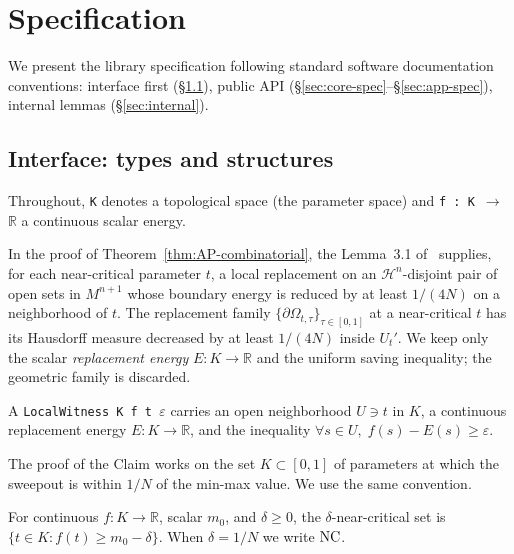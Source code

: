 \section{Specification}
\label{sec:spec}

We present the library specification following standard software
documentation conventions: interface first
(\S\ref{sec:interface}), public API
(\S\ref{sec:core-spec}--\S\ref{sec:app-spec}), internal lemmas
(\S\ref{sec:internal}).

\subsection{Interface: types and structures}
\label{sec:interface}

Throughout, \texttt{K} denotes a topological space (the parameter
space) and \texttt{f : K $\to$ $\mathbb{R}$} a continuous scalar
energy.

In the proof of Theorem~\ref{thm:AP-combinatorial}, the
Lemma~3.1 of~\cite{DLT13} supplies, for each near-critical
parameter $t$, a local replacement on an
$\mathcal{H}^n$-disjoint pair of open sets in $M^{n+1}$ whose
boundary energy is reduced by at least $1/(4N)$ on a
neighborhood of $t$. The replacement family
$\{\partial \Omega_{t,\tau}\}_{\tau \in [0,1]}$ at a
near-critical $t$ has its Hausdorff measure decreased by at
least $1/(4N)$ inside $U_t'$. We keep only the scalar
\emph{replacement energy} $E : K \to \mathbb{R}$ and the
uniform saving inequality; the geometric family is discarded.

\begin{definition}
\label{def:witness}
A \texttt{LocalWitness K f t $\varepsilon$} carries an open
neighborhood $U \ni t$ in $K$, a continuous replacement energy
$E : K \to \mathbb{R}$, and the inequality
$\forall s \in U,\; f(s) - E(s) \ge \varepsilon$.
\end{definition}

The proof of the Claim works on the set $K \subset [0,1]$ of
parameters at which the sweepout is within $1/N$ of the min-max
value. We use the same convention.

\begin{definition}
\label{def:NC}
For continuous $f : K \to \mathbb{R}$, scalar $m_0$, and
$\delta \ge 0$, the $\delta$-near-critical set is
$\{t \in K : f(t) \ge m_0 - \delta\}$. When $\delta = 1/N$ we
write $\mathrm{NC}$.
\end{definition}


